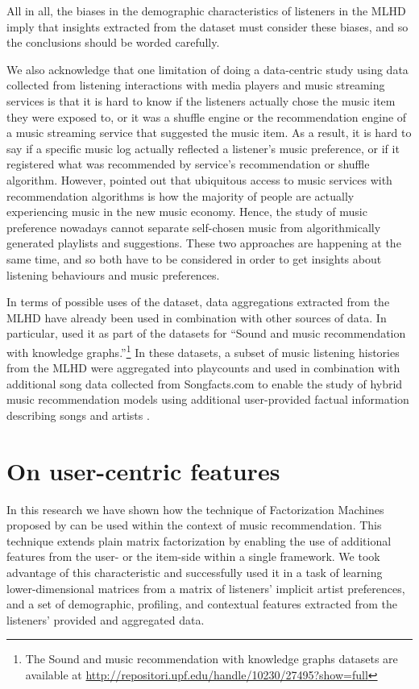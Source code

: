 All in all, the biases in the demographic characteristics of listeners in the MLHD imply that insights extracted from the dataset must consider these biases, and so the conclusions  should be worded carefully.


We also acknowledge that one limitation of doing a data-centric study using data collected from listening interactions with media players and music streaming services is that it is hard to know if the listeners actually chose the music item they were exposed to, or it was a shuffle engine or the recommendation engine of a music streaming service  that suggested the music item. 
As a result, it is hard to say if a specific music log actually reflected a listener's music preference, or if it registered what was recommended by service's recommendation or shuffle algorithm. 
However, \textcite{wikstrom13music} pointed out that ubiquitous access to music services with recommendation algorithms is how the majority of people are actually experiencing music in the new music economy. Hence, the study of music preference nowadays cannot separate self-chosen music from algorithmically generated playlists and suggestions. These two approaches are happening at the same time, and so both have to be considered in order to get insights about listening behaviours and music preferences. 





In terms of possible uses of the dataset, data aggregations extracted from the MLHD have already been used in combination with other sources of data. In particular,  \textcite{oramas16sound} used it as part of the datasets for ``Sound and music recommendation with knowledge graphs.''\footnote{The Sound and music recommendation with knowledge graphs datasets are available at \url{http://repositori.upf.edu/handle/10230/27495?show=full}} In these datasets, a subset of music listening histories from the MLHD were aggregated into playcounts and used in combination with additional song data collected from Songfacts.com to enable the study of hybrid music recommendation models using additional user-provided factual information describing songs and artists \autocite{oramas15sound}.


\section{On user-centric features}\label{sec:conc_features}
In this research we have shown how the technique of Factorization Machines proposed by \textcite{rendle10factorization} can be used within the context of music recommendation. 
This technique extends plain matrix factorization by enabling the use of additional features from the user- or the item-side within a single framework.
We took advantage of this characteristic and successfully used it in a task of learning lower-dimensional matrices from a matrix of listeners' implicit artist preferences, and a set of demographic, profiling, and contextual features extracted from the listeners' provided and aggregated data.

